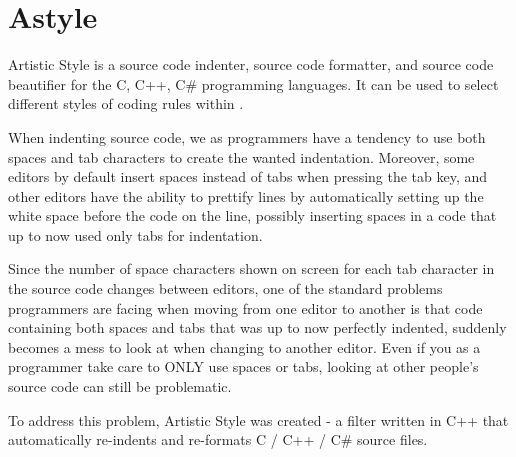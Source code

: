 \section{Astyle}\label{sec:astyle}

Artistic Style is a source code indenter, source code formatter, and source code beautifier for the C, C++, C\# programming languages. It can be used to select different styles of coding rules within \codeblocks.


When indenting source code, we as programmers have a tendency to use both spaces and tab characters to create the wanted indentation. Moreover, some editors by default insert spaces instead of tabs when pressing the tab key, and other editors have the ability to prettify lines by automatically setting up the white space before the code on the line, possibly inserting spaces in a code that up to now used only tabs for indentation.

Since the number of space characters shown on screen for each tab character in the source code changes between editors, one of the standard problems programmers are facing when moving from one editor to another is that code containing both spaces and tabs that was up to now perfectly indented, suddenly becomes a mess to look at when changing to another editor. Even if you as a programmer take care to ONLY use spaces or tabs, looking at other people's source code can still be problematic.

To address this problem, Artistic Style was created - a filter written in C++ that automatically re-indents and re-formats C / C++ / C\# source files.

